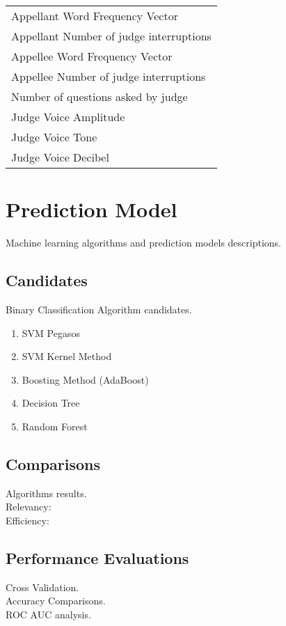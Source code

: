 \documentclass{article} %
\begin{document}
\begin{multicols}{2}
\begin{tabular}{l}
Appellant Word Frequency Vector\\
Appellant Number of judge interruptions\\
Appellee Word Frequency Vector\\
Appellee Number of judge interruptions\\
Number of questions asked by judge\\
Judge Voice Amplitude\\
Judge Voice Tone\\
Judge Voice Decibel\\
\end{tabular}

\end{multicols}

\pagebreak

\section{Prediction Model}
Machine learning algorithms and prediction models descriptions.

\subsection{Candidates}
Binary Classification Algorithm candidates.

\begin{enumerate}
\item SVM Pegasos
\item SVM Kernel Method
\item Boosting Method (AdaBoost)
\item Decision Tree
\item Random Forest
\end{enumerate}

\subsection{Comparisons}
Algorithms results.\\
Relevancy:\\
Efficiency:\\

\subsection{Performance Evaluations}
Cross Validation.\\
Accuracy Comparisons.\\
ROC AUC analysis.\\
\end{document}
